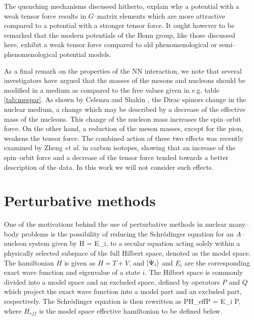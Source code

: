 The quenching mechanisms discussed hitherto, explain why a potential
with a weak tensor force results in $G$--matrix
elements which are more attractive
compared to a potential with a stronger tensor force.
It ought
however to be remarked that the modern potentials of the Bonn group, like
those discussed here, exhibit a weak tensor force compared to old
phenomenological or semi--phenomenological potential models.

As a final remark on the properties of the NN interaction, we note
that several investigators \cite{sw86,br89,bmp90,ban92} have argued that
the masses of the mesons and nucleons should be modified in a medium as
compared to the free values given in e.g. table \ref{tab:mespar}.
As shown by Celenza and Shakin \cite{cs86},
the Dirac spinors change in the nuclear
medium, a change which may be described by a decrease of the effective
mass of the nucleons. This change of the nucleon mass increases the
spin--orbit force. On the other hand, a reduction of the meson masses,
except for the pion, weakens the tensor force. The combined action
of these two effects was recently examined by Zheng {\em et al.}
\cite{zzm92} in carbon isotopes, showing that an increase
of the spin--orbit force and a decrease of the tensor force tended
towards a better description of the data. In this work we will
not consider such effects.



\section{Perturbative methods}
One of the motivations behind the use of perturbative methods
in nuclear many--body problems is the possibility of reducing the
Schr\"{o}dinger equation for an $A$--nucleon system given by
\be
H = E_i,\label{eq:schr}
\ee
to a secular equation acting solely within a
physically selected subspace of the
full Hilbert space, denoted as the model space. The hamiltonian $H$ is
given as $H=T+V$, and $\left| \Psi_i \right\rangle$ and $E_i$ are the corresponding exact
wave function and eigenvalue of a state $i$.
The Hilbert space is commonly divided into a model space and
an excluded space, defined by operators $P$ and $Q$ which project the
exact wave function into a model part and an excluded part, respectively.
The Schr\"{o}dinger equation is then rewritten as
\be
PH_{eff}P = E_i P,
\ee
where $H_{eff}$ is the model space effective hamiltonian to be defined
below.

